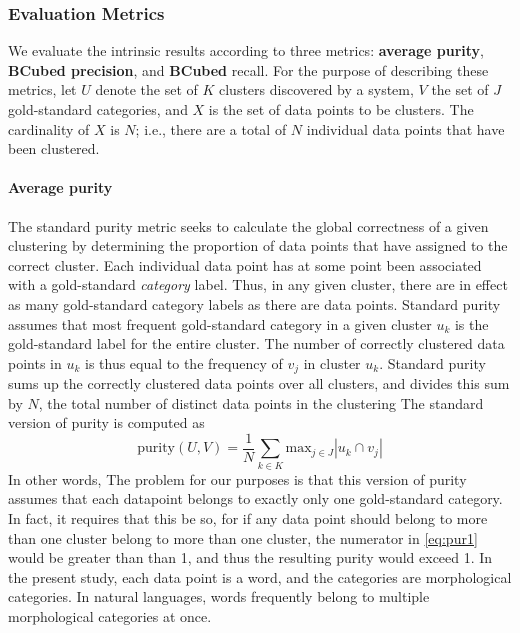 \subsubsection{Evaluation Metrics} 
\label{sec:metrics}
We evaluate the intrinsic results according to three metrics: \textbf{average purity}, \textbf{BCubed precision}, and
 \textbf{BCubed} recall. For the purpose of describing these metrics,
 let $U$ denote the set of $K$ clusters discovered by a system, $V$ the set of $J$ gold-standard categories, and $X$ is the set of data points to be clusters. The cardinality of $X$ is $N$; i.e., there are a total of $N$ individual data points that have been clustered.
\paragraph{Average purity}
The standard purity metric seeks to calculate the global correctness of a given clustering by determining the proportion of data points that have assigned to the correct cluster. Each individual data point has at some point been associated with a gold-standard \emph{category} label. Thus, in any given cluster, there are in effect as many gold-standard category labels as there are data points. Standard purity assumes that most frequent 
 gold-standard category in a given cluster $u_k$ is the gold-standard label for the entire cluster. The number of correctly clustered data points in $u_k$ is thus equal to the frequency of  $v_j$ in cluster $u_k$. Standard purity sums up the correctly clustered data points over all clusters, and divides this sum by $N$, the total number of distinct data points in the clustering
 The standard version of purity is computed as 
\begin{equation} \label{eq:pur1}
\text{purity}(U, V) = \frac{1}{N} \sum_{k \in K} \text{max}_{j \in J} |u_k \cap v_j|
\end{equation}
In other words, 
The problem for our purposes is that this version of purity assumes that each datapoint belongs to exactly only one gold-standard category. In fact, it requires that this be so, for if any data point should belong to more than one cluster belong to more than one cluster, the numerator in \eqref{eq:pur1} would be greater than than 1, and thus the resulting purity would exceed 1.
In the present study, each data point is a word, and the categories are morphological categories. In natural languages, words frequently belong to multiple morphological categories at once.

